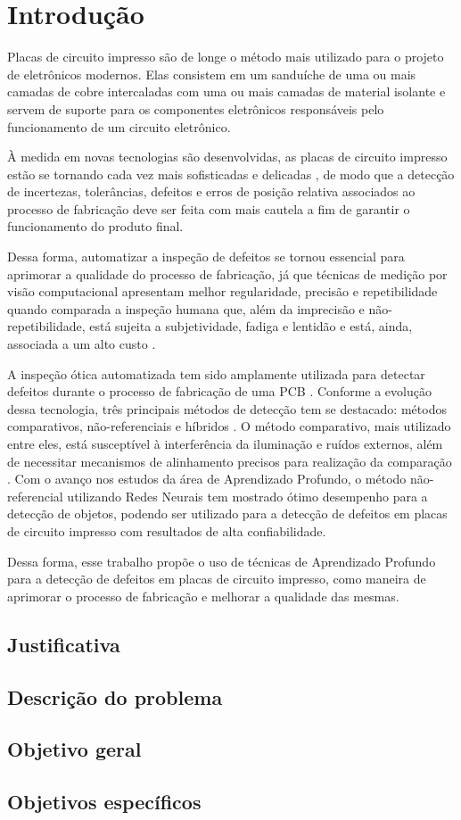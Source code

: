 \chapter{Introdução}
Placas de circuito impresso são de longe o método mais utilizado para o projeto de eletrônicos modernos. Elas consistem em um sanduíche de uma ou mais camadas de cobre intercaladas com uma ou mais camadas de material isolante \cite{ref:Zumbahlen} e servem de suporte para os componentes eletrônicos responsáveis pelo funcionamento de um circuito eletrônico.

À medida em novas tecnologias são desenvolvidas, as placas de circuito impresso estão se tornando cada vez mais sofisticadas e delicadas \cite{ref:Hu-Wang}, de modo que a detecção de incertezas, tolerâncias, defeitos e erros de posição relativa associados ao processo de fabricação \cite{ref:Leta-Feliciano-Martins} deve ser feita com mais cautela a fim de garantir o funcionamento do produto final.

Dessa forma, automatizar a inspeção de defeitos se tornou essencial para aprimorar a qualidade do processo de fabricação, já que técnicas de medição por visão computacional apresentam melhor regularidade, precisão e repetibilidade quando comparada a inspeção humana que, além da imprecisão e não-repetibilidade, está sujeita a subjetividade, fadiga e lentidão e está, ainda, associada a um alto custo \cite{ref:Leta-Feliciano-Martins}.

A inspeção ótica automatizada tem sido amplamente utilizada para detectar defeitos durante o processo de fabricação de uma PCB \cite{ref:Chin-Harlow}. Conforme a evolução dessa tecnologia, três principais métodos de detecção tem se destacado: métodos comparativos, não-referenciais e híbridos \cite{ref:Wu-Wang-Liu}. O método comparativo, mais utilizado entre eles, está susceptível à interferência da iluminação e ruídos externos, além de necessitar mecanismos de alinhamento precisos para realização da comparação \cite{ref:Hu-Wang}. Com o avanço nos estudos da área de Aprendizado Profundo, o método não-referencial utilizando Redes Neurais tem mostrado ótimo desempenho para a detecção de objetos, podendo ser utilizado para a detecção de defeitos em placas de circuito impresso com resultados de alta confiabilidade.

Dessa forma, esse trabalho propõe o uso de técnicas de Aprendizado Profundo para a detecção de defeitos em placas de circuito impresso, como maneira de aprimorar o processo de fabricação e melhorar a qualidade das mesmas.

\section{Justificativa}


\section{Descrição do problema}
\section{Objetivo geral}
\section{Objetivos específicos}

